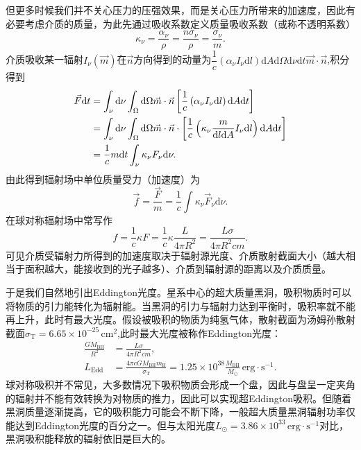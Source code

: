 \documentclass[../天体物理基础.tex]{subfiles}
\begin{document}
但更多时候我们并不关心压力的压强效果，而是关心压力所带来的加速度，因此有必要考虑介质的质量，为此先通过吸收系数定义质量吸收系数（或称不透明系数）
\begin{equation}
\kappa_\nu=\frac{\alpha_\nu}\rho=\frac{n\sigma_{\nu}}{\rho}=\frac{\sigma_\nu}{m}.
\end{equation}
介质吸收某一辐射$I_{\nu}\left(\vec{m}\right)$在$\vec n$方向得到的动量为$\dfrac{1}{c}\left(\alpha_\nu I_\nu\mathrm{d}l\right)\mathrm{d}A\mathrm{d}\Omega\mathrm{d}\nu\mathrm{d}t\vec{m}\cdot\vec{n}$,积分得到
\begin{align}
\vec{F}\mathrm{d}t&=\int_{\nu}\mathrm{d}\nu\int_{\Omega}\mathrm{d}\Omega\vec{m}\cdot\vec{n}\left[\frac{1}{c}\left(\alpha_{\nu}I_{\nu}\mathrm{d}l\right)\mathrm{d}A\mathrm{d}t\right]\notag\\
&=\int_{\nu}\mathrm{d}\nu\int_{\Omega}\mathrm{d}\Omega\vec{m}\cdot\vec{n}\cdot\left[\frac{1}{c}\left(\kappa_{\nu}\frac{m}{\mathrm{d}l\mathrm{d}A}I_{\nu}\mathrm{d}l\right)\mathrm{d}A\mathrm{d}t\right]\notag\\
&=\frac{1}{c}m\mathrm{d}t\int_{\nu}\kappa_{\nu}F_{\nu}\mathrm{d}\nu.
\end{align}
由此得到辐射场中单位质量受力（加速度）为
\begin{equation}
\vec{f}=\frac{\vec{F}}{m}=\frac{1}{c}\int\kappa_{\nu}\vec{F}_{\nu}\mathrm{d}\nu.
\end{equation}
在球对称辐射场中常写作
\begin{equation}
f=\frac{1}{c}\kappa F=\frac{1}{c}\kappa\dfrac{L}{4\pi R^2}=\frac{L\sigma}{4\pi R^{2}cm}.
\end{equation}
可见介质受辐射力所得到的加速度取决于辐射源光度、介质散射截面大小（越大相当于面积越大，能接收到的光子越多）、介质到辐射源的距离以及介质质量。

于是我们自然地引出Eddington光度。星系中心的超大质量黑洞，吸积物质时可以将物质的引力能转化为辐射能。当黑洞的引力与辐射力达到平衡时，吸积率就不能再上升，此时有最大光度。假设被吸积的物质为纯氢气体，散射截面为汤姆孙散射截面$\sigma_{\text{T}}=6.65\times10^{-25}\,\mathrm{cm}^{2}$,此时最大光度被称作Eddington光度：
\begin{align}
\frac{GM_{\text{BH}}}{R^{2}}&=\frac{L\sigma}{4\pi R^{2}cm},\\
L_{\text{Edd}}&=\frac{4\pi cGM_{\text{BH}}m_{\mathrm{H}}}{\sigma_{\text{T}}}=1.25\times10^{38}\frac{M_{\text{BH}}}{M_\odot}\,\mathrm{erg\cdot{}s^{-1}}.
\end{align}
球对称吸积并不常见，大多数情况下吸积物质会形成一个盘，因此与盘呈一定夹角的辐射并不能有效转换为对物质的推力，因此可以实现超Eddington吸积。但随着黑洞质量逐渐提高，它的吸积能力可能会不断下降，一般超大质量黑洞辐射功率仅能达到Eddington光度的百分之一。但与太阳光度$L_{\odot}=3.86\times10^{33}\,\mathrm{erg\cdot s^{-1}}$对比，黑洞吸积能释放的辐射依旧是巨大的。
\end{document}
